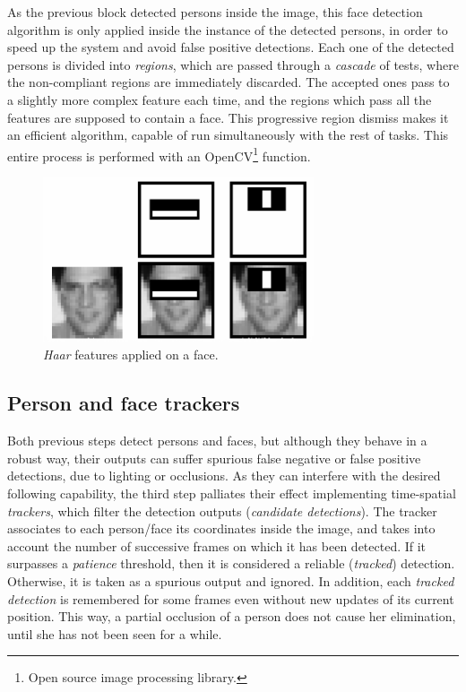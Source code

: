 As the previous block detected persons inside the image, this face detection algorithm is only applied inside the instance of the detected persons, in order to speed up the system and avoid false positive detections. Each one of the detected persons is divided into \emph{regions}, which are passed through a \emph{cascade} of tests, where the non-compliant regions are immediately discarded. The accepted ones pass to a slightly more complex feature each time, and the regions which pass all the features are supposed to contain a face. This progressive region dismiss makes it an efficient algorithm, capable of run simultaneously with the rest of tasks. This entire process is performed with an OpenCV\footnote{Open source image processing library.} function.

\begin{figure}[h]
	\centering
	\includegraphics[width=8cm]{images/haar_on_face}
	\caption{\emph{Haar} features applied on a face.}
	\label{fig:perception_haar}
\end{figure}


\subsection{Person and face trackers}

Both previous steps detect persons and faces, but although they behave in a robust way, their outputs can suffer spurious false negative or false positive detections, due to lighting or occlusions. As they can interfere with the desired following capability, the third step palliates their effect implementing time-spatial \emph{trackers}, which filter the detection outputs (\emph{candidate detections}). The tracker associates to each person/face its coordinates inside the image, and takes into account the number of successive frames on which it has been detected. If it surpasses a \emph{patience} threshold, then it is considered a reliable (\emph{tracked}) detection. Otherwise, it is taken as a spurious output and ignored. In addition, each \emph{tracked detection} is remembered for some frames even without new updates of its current position. This way, a partial occlusion of a person does not cause her elimination, until she has not been seen for a while.


